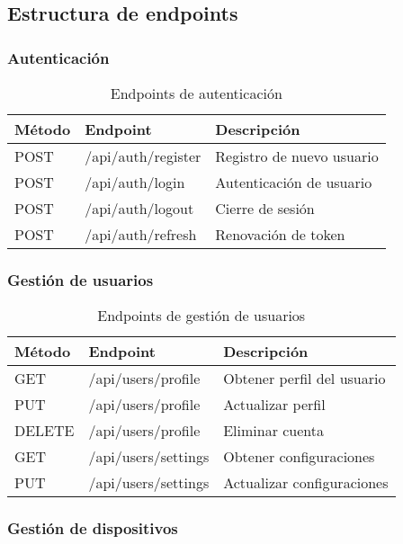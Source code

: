 \subsection{Estructura de endpoints}

\subsubsection{Autenticación}

\begin{table}[H]
\centering
\begin{tabular}{|l|l|l|}
\hline
\textbf{Método} & \textbf{Endpoint} & \textbf{Descripción} \\
\hline
POST & /api/auth/register & Registro de nuevo usuario \\
POST & /api/auth/login & Autenticación de usuario \\
POST & /api/auth/logout & Cierre de sesión \\
POST & /api/auth/refresh & Renovación de token \\
\hline
\end{tabular}
\caption{Endpoints de autenticación}
\label{tab:endpoints_auth}
\end{table}

\subsubsection{Gestión de usuarios}

\begin{table}[H]
\centering
\begin{tabular}{|l|l|l|}
\hline
\textbf{Método} & \textbf{Endpoint} & \textbf{Descripción} \\
\hline
GET & /api/users/profile & Obtener perfil del usuario \\
PUT & /api/users/profile & Actualizar perfil \\
DELETE & /api/users/profile & Eliminar cuenta \\
GET & /api/users/settings & Obtener configuraciones \\
PUT & /api/users/settings & Actualizar configuraciones \\
\hline
\end{tabular}
\caption{Endpoints de gestión de usuarios}
\label{tab:endpoints_users}
\end{table}

\subsubsection{Gestión de dispositivos}


